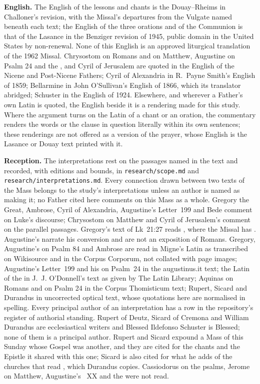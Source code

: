 {\textbf{English.} The English of the lessons and chants is the Douay--Rheims
in Challoner's revision, with the Missal's departures from the Vulgate named
beneath each text; the English of the three orations and of the Communion is
that of the Lasance  in the Benziger revision of 1945,
public domain in the United States by non-renewal. None of this English is
an approved liturgical translation of the 1962 Missal. Chrysostom on Romans
and on Matthew, Augustine on Psalm 24 and the , and Cyril of
Jerusalem are quoted in the English of the Nicene and Post-Nicene Fathers;
Cyril of Alexandria in R.~Payne Smith's English of 1859; Bellarmine in John
O'Sullivan's English of 1866, which its translator abridged; Schuster in the
English of 1924. Elsewhere, and wherever a Father's own Latin is quoted, the
English beside it is a rendering made for this study. Where the argument
turns on the Latin of a chant or an oration, the commentary renders the words
or the clause in question literally within its own sentences; these
renderings are not offered as a version of the prayer, whose English is the
Lasance or Douay text printed with it.

\textbf{Reception.} The interpretations rest on the passages named in the text
and recorded, with editions and bounds, in \texttt{research/scope.md} and
\texttt{research/interpretations.md}. Every connection drawn between two texts
of the Mass belongs to the study's interpretations unless an author is named as
making it; no Father cited here comments on this Mass as a whole. Gregory the
Great, Ambrose, Cyril of Alexandria, Augustine's Letter~199 and Bede comment on
Luke's discourse; Chrysostom on Matthew and Cyril of Jerusalem's
 comment on the parallel passages. Gregory's text
of Lk~21:27 reads , where the Missal has .
Augustine's  narrate his
conversion and are not an exposition of Romans. Gregory, Augustine's
 on Psalm 84 and Ambrose are read in Migne's Latin as
transcribed on Wikisource and in the Corpus Corporum, not collated with page
images; Augustine's Letter~199 and his  on Psalm~24 in the
augustinus.it text; the Latin of the  in J.~J. O'Donnell's
text as given by The Latin Library; Aquinas on Romans and
on Psalm 24 in the Corpus Thomisticum text; Rupert, Sicard and Durandus in
uncorrected optical text, whose quotations here are normalised in spelling.
Every principal author of an interpretation has a row in the repository's
register of authorial standing. Rupert of Deutz, Sicard of Cremona and William
Durandus are ecclesiastical writers and Blessed Ildefonso Schuster is
Blessed; none of them is a principal author. Rupert and Sicard expound a Mass
of this Sunday whose Gospel was another, and they are cited for the chants
and the Epistle it shared with this one; Sicard is also cited for what he adds
of the churches that read , which Durandus copies. Cassiodorus on the psalms, Jerome on
Matthew, Augustine's ~XX and the  were
not read.

}
